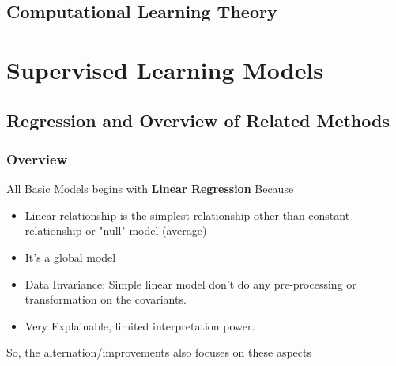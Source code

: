 \documentclass[11pt, openany]{book}              %
\begin{document}
\chapter{Computational Learning Theory}

\part{Supervised Learning Models}

\chapter{Regression and Overview of Related Methods}

\section{Overview}

All Basic Models begins with \textbf{Linear Regression} Because

\begin{itemize}
    \item Linear relationship is the simplest relationship other than constant relationship or "null" model (average)
    \item It's a global model
    \item Data Invariance: Simple linear model don't do any pre-processing or transformation on the covariants.
    \item Very Explainable, limited interpretation power.
\end{itemize}
 
 So, the alternation/improvements also focuses on these aspects
 
\end{document}
